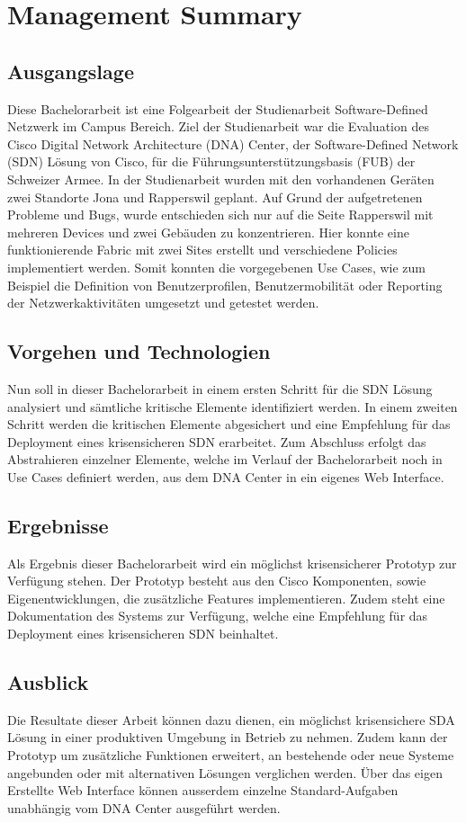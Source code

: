 \section{Management Summary}

\subsection{Ausgangslage}
Diese Bachelorarbeit ist eine Folgearbeit der Studienarbeit Software-Defined Netzwerk im Campus Bereich. Ziel der Studienarbeit war die Evaluation des Cisco Digital Network Architecture (DNA) Center, der Software-Defined Network (SDN) Lösung von Cisco, für die Führungsunterstützungsbasis (FUB) der Schweizer Armee. In der Studienarbeit wurden mit den vorhandenen Geräten zwei Standorte Jona und Rapperswil geplant. Auf Grund der aufgetretenen Probleme und Bugs, wurde entschieden sich nur auf die Seite Rapperswil mit mehreren Devices und zwei Gebäuden zu konzentrieren. Hier konnte eine funktionierende Fabric mit zwei Sites erstellt und verschiedene Policies implementiert werden. Somit konnten die vorgegebenen Use Cases, wie zum Beispiel die Definition von Benutzerprofilen, Benutzermobilität oder Reporting der Netzwerkaktivitäten umgesetzt und getestet werden.

\subsection{Vorgehen und Technologien}
Nun soll in dieser Bachelorarbeit in einem ersten Schritt für die SDN Lösung analysiert und sämtliche kritische Elemente identifiziert werden. In einem zweiten Schritt werden die kritischen Elemente abgesichert und eine Empfehlung für das Deployment eines krisensicheren SDN erarbeitet. Zum Abschluss erfolgt das Abstrahieren einzelner Elemente, welche im Verlauf der Bachelorarbeit noch in Use Cases definiert werden, aus dem DNA Center in ein eigenes Web Interface. 

\subsection{Ergebnisse}
Als Ergebnis dieser Bachelorarbeit wird ein möglichst krisensicherer Prototyp zur Verfügung stehen. Der Prototyp besteht aus den Cisco Komponenten, sowie Eigenentwicklungen, die zusätzliche Features implementieren. Zudem steht eine Dokumentation des Systems zur Verfügung, welche eine Empfehlung für das Deployment eines krisensicheren SDN beinhaltet.

\subsection{Ausblick}
Die Resultate dieser Arbeit können dazu dienen, ein möglichst krisensichere SDA Lösung in einer produktiven Umgebung in Betrieb zu nehmen. Zudem kann der Prototyp um zusätzliche Funktionen erweitert, an bestehende oder neue Systeme angebunden oder mit alternativen Lösungen verglichen werden. Über das eigen Erstellte Web Interface können ausserdem einzelne Standard-Aufgaben unabhängig vom DNA Center ausgeführt werden.
 
